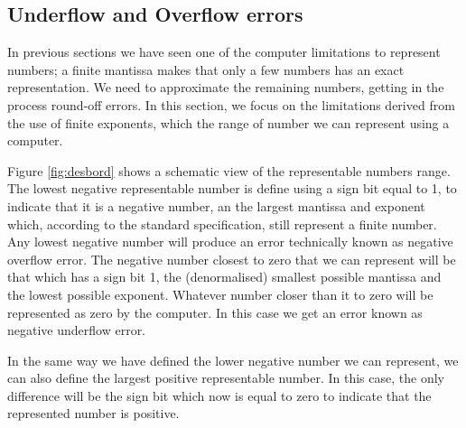 \begin{paracol}{2}
\subsection{Underflow and Overflow errors}  
In previous sections we have seen one of the computer limitations to represent numbers; a finite mantissa makes that only a few numbers has an exact representation. We need to approximate the remaining numbers, getting in the process round-off errors. In this section, we focus on the limitations derived from the use of finite exponents, which the range of number we can represent using a computer.

Figure \ref{fig:desbord} shows a schematic view of the representable numbers range. The lowest negative representable number is define using a sign bit equal to 1, to indicate that it is a negative number, an the largest mantissa and exponent which, according to the standard specification, still represent a finite number. Any lowest negative number will produce an error technically known as negative overflow error. The negative number closest to zero that we can represent will be that which has a sign bit 1, the (denormalised) smallest possible mantissa and the lowest possible exponent. Whatever number closer than it to zero will be represented as zero by the computer. In this case we get an error known as negative underflow error.

In the same way we have defined the lower negative number we can represent, we can also define the largest positive representable number. In this case, the only difference will be the sign bit which now is equal to zero to indicate that the represented number is positive.  

          

\end{paracol}

